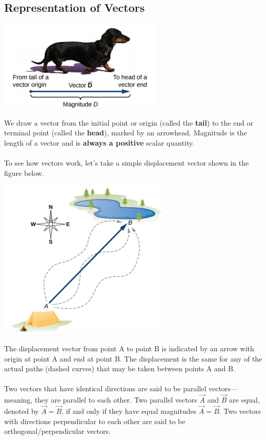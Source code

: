 \documentclass[12pt,addpoints]{exam}
\begin{document}
    \subsection*{Representation of Vectors}
    \begin{center}
    \includegraphics[scale=0.5]{dog.png}	
    \end{center}
    We draw a vector from the initial point or origin (called the \textbf{tail}) to the end or terminal point (called the \textbf{head}), marked by an arrowhead. Magnitude is the length of a vector and is \textbf{always a positive }scalar quantity. \\ \\
    To see how vectors work, let's take a simple displacement vector shown in the figure below.
    \begin{center}
    	\includegraphics[scale=0.4]{disp.png}
    \end{center}
    The displacement vector from point A to point B is indicated by an arrow with origin at point A and end at point B. The displacement is the same for any of the actual paths (dashed curves) that may be taken between points A and B. \\ \\
    Two vectors that have identical directions are said to be parallel vectors—meaning, they are parallel to each other. Two parallel vectors $\vec{A}$ and $\vec{B}$ are equal, denoted by $\vec{A}=\vec{B}$, if and only if they have equal magnitudes $\vec{A}=\vec{B}$. Two vectors with directions perpendicular to each other are said to be orthogonal/perpendicular vectors. 
\end{document}
